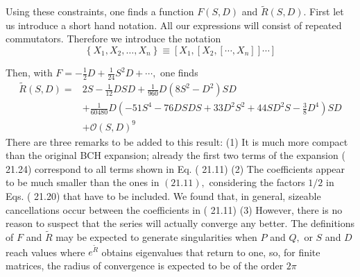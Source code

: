 \documentclass[main.tex]{subfiles}
\begin{document}
Using these constraints, one finds a function $F(S, D)$ and $\tilde{R}(S, D) .$ First let us introduce a short hand notation. All our expressions will consist of repeated commutators. Therefore we introduce the notation
$$
\left\{X_{1}, X_{2}, \ldots, X_{n}\right\} \equiv\left[X_{1},\left[X_{2},\left[\cdots, X_{n}\right]\right] \cdots\right]
$$

Then, with $F=-\frac{1}{2} D+\frac{1}{24} S^{2} D+\cdots,$ one finds
$$
\begin{aligned}
\tilde{R}(S, D)=& 2 S-\frac{1}{12} D S D+\frac{1}{960} D\left(8 S^{2}-D^{2}\right) S D \\
&+\frac{1}{60480} D\left(-51 S^{4}-76 D S D S+33 D^{2} S^{2}+44 S D^{2} S-\frac{3}{8} D^{4}\right) S D \\
&+\mathcal{O}(S, D)^{9}
\end{aligned}
$$
There are three remarks to be added to this result:
(1) It is much more compact than the original BCH expansion; already the first two terms of the expansion ( 21.24) correspond to all terms shown in Eq. ( 21.11)
(2) The coefficients appear to be much smaller than the ones in $(21.11),$ considering the factors $1 / 2$ in Eqs. ( 21.20) that have to be included. We found that, in general, sizeable cancellations occur between the coefficients in ( 21.11)
(3) However, there is no reason to suspect that the series will actually converge any better. The definitions of $F$ and $\tilde{R}$ may be expected to generate singularities when $P$ and $Q,$ or $S$ and $D$ reach values where $e^{\tilde{R}}$ obtains eigenvalues that return to one, so, for finite matrices, the radius of convergence is expected to be of the order $2 \pi$
\end{document}
